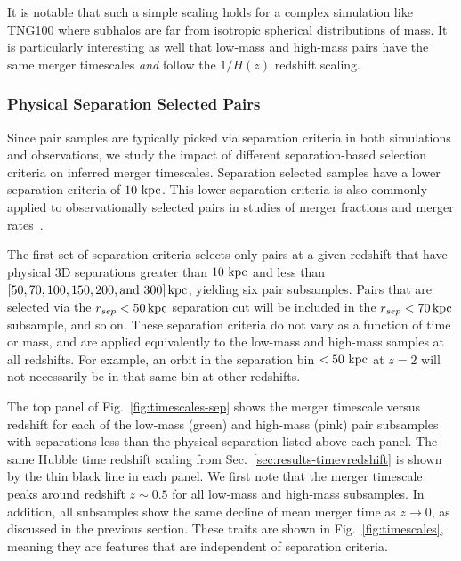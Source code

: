 \documentclass[twocolumn,linenumbers]{aastex631}
\begin{document}
        It is notable that such a simple scaling holds for a complex simulation like TNG100 where subhalos are far from isotropic spherical distributions of mass.
        It is particularly interesting as well that low-mass and high-mass pairs have the same merger timescales \textit{and} follow the $1/H(z)$ redshift scaling. 
        
            


            

    \subsubsection{Physical Separation Selected Pairs }
    \label{sec:results-phys}
        Since pair samples are typically picked via separation criteria in both simulations and observations, we study the impact of different separation-based selection criteria on inferred merger timescales.
        Separation selected samples have a lower separation criteria of $10\,\mathrm{\,kpc}$.
        This lower separation criteria is also commonly applied to observationally selected pairs in studies of merger fractions and merger rates~\citep[see e.g.][and observational studies cited therein]{Lotz2011,Snyder2017,Besla2018}.
        
        The first set of separation criteria selects only pairs at a given redshift that have physical 3D separations greater than $10\,\mathrm{\,kpc}$ and less than $[50, 70, 100, 150, 200, \mbox{and }300]\mathrm{\,kpc}$, yielding six pair subsamples. 
        Pairs that are selected via the $r_{sep}<50\mathrm{\,kpc}$ separation cut will be included in the $r_{sep}<70\mathrm{\,kpc}$ subsample, and so on.
        These separation criteria do not vary as a function of time or mass, and are applied equivalently to the low-mass and high-mass samples at all redshifts. 
        For example, an orbit in the separation bin $<50\,\mathrm{\,kpc}$ at $z=2$ will not necessarily be in that same bin at other redshifts. 
        
        The top panel of Fig.~\ref{fig:timescales-sep} shows the merger timescale versus redshift for each of the low-mass (green) and high-mass (pink) pair subsamples with separations less than the physical separation listed above each panel. 
        The same Hubble time redshift scaling from Sec.~\ref{sec:results-timevredshift} is shown by the thin black line in each panel.
        We first note that the merger timescale peaks around redshift $z\sim0.5$ for all low-mass and high-mass subsamples. 
        In addition, all subsamples show the same decline of mean merger time as $z\to0$, as discussed in the previous section. 
        These traits are shown in Fig.~\ref{fig:timescales}, meaning they are features that are independent of separation criteria.
        
\end{document}
